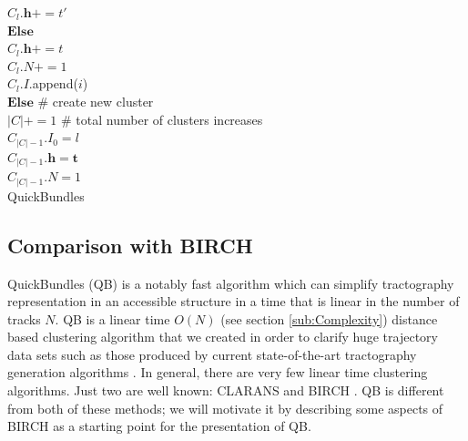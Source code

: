 \documentclass[preprint,authoryear,a4paper,10pt,onecolumn]{elsarticle}
\begin{document}
\begin{algorithm}
\hspace*{4em} $C_{l}.\mathbf{h}+=t'$\\
\hspace*{2em} $\textbf{Else}$ \\
\hspace*{4em} $C_{l}.\mathbf{h}+=t$\\
\hspace*{2em} $C_{l}.N+=1$\\
\hspace*{2em} $C_{l}.I$.append($i$)\\
$\textbf{Else}$ \# create new cluster\\
\hspace*{2em} $|C|+=1$ \# total number of clusters increases\\
\hspace*{2em} $C_{|C|-1}.I_{0}=l$\\
\hspace*{2em} $C_{|C|-1}.\mathbf{h}=\mathbf{t}$\\
\hspace*{2em} $C_{|C|-1}.N=1$\\
\caption{QuickBundles}

\label{Alg:QuickBundles}
\end{algorithm}

\subsection{Comparison with BIRCH}

QuickBundles (QB) is a notably fast algorithm which can simplify
tractography representation in an accessible structure in a time that is
linear in the number of tracks $N$. QB is a linear time $O(N)$ (see
section \ref{sub:Complexity}) distance based clustering algorithm that
we created in order to clarify huge trajectory data sets such as those
produced by current state-of-the-art tractography generation algorithms
\citep{Parker2003,WWS+08}. In general, there are very few linear time
clustering algorithms. Just two are well known: CLARANS
\citep{ng2002clarans} and BIRCH \citep{zhang1997birch}. QB is different
from both of these methods; we will motivate it by describing some
aspects of BIRCH as a starting point for the presentation of QB.
\end{document}
